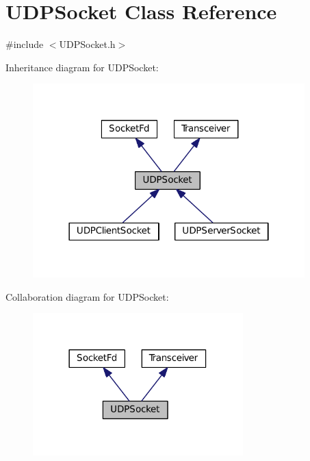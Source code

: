 \hypertarget{classUDPSocket}{\section{U\+D\+P\+Socket Class Reference}
\label{classUDPSocket}
}


{\ttfamily \#include $<$U\+D\+P\+Socket.\+h$>$}



Inheritance diagram for U\+D\+P\+Socket\+:
\nopagebreak
\begin{figure}[H]
\begin{center}
\leavevmode
\includegraphics[width=298pt]{classUDPSocket__inherit__graph}
\end{center}
\end{figure}


Collaboration diagram for U\+D\+P\+Socket\+:
\nopagebreak
\begin{figure}[H]
\begin{center}
\leavevmode
\includegraphics[width=230pt]{classUDPSocket__coll__graph}
\end{center}
\end{figure}
